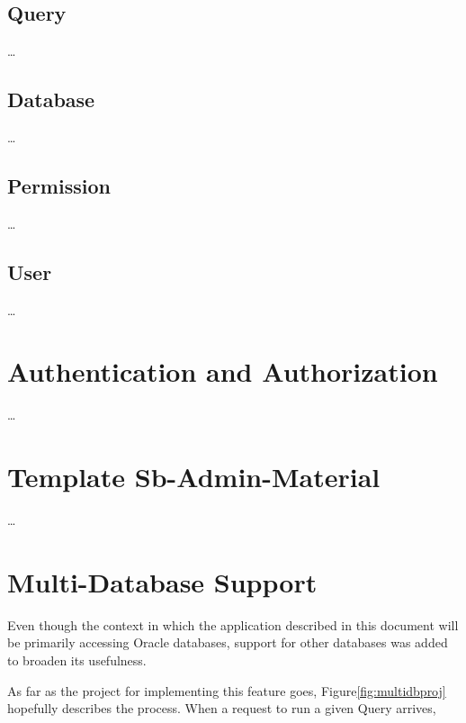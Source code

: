 \subsection{Query}\label{model:query}
\dots
\subsection{Database}
\dots
\subsection{Permission}
\dots
\subsection{User}\label{model:user}
\dots

\section{Authentication and Authorization}\label{proj:auth}
\dots

\section{Template Sb-Admin-Material}
\dots
\section{Multi-Database Support}


Even though the context in which the application described in this document will be primarily accessing Oracle databases, support for other databases was added to broaden its usefulness.

As far as the project for implementing this feature goes, Figure\ref{fig:multidbproj} hopefully describes the process. When a request to run a given Query arrives,
